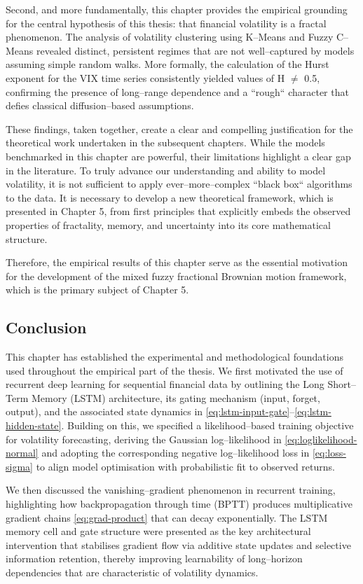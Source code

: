 \documentclass[12pt,a4paper]{report}
\numberwithin{equation}{section}
\begin{document}
Second, and more fundamentally, this chapter provides the empirical
grounding for the central hypothesis of this thesis: that financial
volatility is a fractal phenomenon. The analysis of volatility
clustering using K--Means and Fuzzy C--Means revealed distinct, persistent
regimes that are not well--captured by models assuming simple random
walks. More formally, the calculation of the Hurst exponent for the VIX
time series consistently yielded values of H $\neq$ 0.5, confirming the
presence of long--range dependence and a ``rough`` character that defies
classical diffusion--based assumptions.

These findings, taken together, create a clear and compelling
justification for the theoretical work undertaken in the subsequent
chapters. While the models benchmarked in this chapter are powerful,
their limitations highlight a clear gap in the literature. To truly
advance our understanding and ability to model volatility, it is not
sufficient to apply ever--more--complex ``black box`` algorithms to the
data. It is necessary to develop a new theoretical framework, which is presented in Chapter 5, from first
principles that explicitly embeds the observed properties of fractality,
memory, and uncertainty into its core mathematical structure.

Therefore, the empirical results of this chapter serve as the essential
motivation for the development of the mixed fuzzy fractional Brownian
motion framework, which is the primary subject of Chapter 5.

\subsection{Conclusion}

This chapter has established the experimental and methodological foundations used throughout the empirical part of the thesis. We first motivated the use of recurrent deep learning for sequential financial data by outlining the Long Short--Term Memory (LSTM) architecture, its gating mechanism (input, forget, output), and the associated state dynamics in \eqref{eq:lstm-input-gate}--\eqref{eq:lstm-hidden-state}. Building on this, we specified a likelihood--based training objective for volatility forecasting, deriving the Gaussian log--likelihood in \eqref{eq:loglikelihood-normal} and adopting the corresponding negative log--likelihood loss in \eqref{eq:loss-sigma} to align model optimisation with probabilistic fit to observed returns.

We then discussed the vanishing--gradient phenomenon in recurrent training, highlighting how backpropagation through time (BPTT) produces multiplicative gradient chains \eqref{eq:grad-product} that can decay exponentially. The LSTM memory cell and gate structure were presented as the key architectural intervention that stabilises gradient flow via additive state updates and selective information retention, thereby improving learnability of long--horizon dependencies that are characteristic of volatility dynamics.
\end{document}
